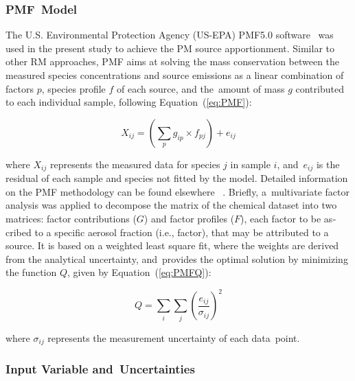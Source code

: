 \begin{otherlanguage}{english}
\subsubsection{PMF~Model}%
\label{ssub:pmf_model}

The U.S. Environmental Protection Agency (US-EPA) PMF5.0 software~\autocite{norrisEPA2014}
was used in the present study to achieve the PM source apportionment. Similar to other RM
approaches, PMF aims at solving the mass conservation between the measured species
concentrations and source emissions as a linear combination of factors $p$, species
profile $f$ of each source,  and the~amount of mass $g$ contributed to each individual
sample, following Equation~(\ref{eq:PMF}):

\begin{equation}
    \label{eq:PMF}
    X_{ij} = \left( \sum_p g_{ip} \times f_{pj} \right) + e_{ij}
\end{equation}

where $X_{ij}$ represents the measured data for species $j$ in sample $i$, and~$e_{ij}$ is
the residual of each sample and species not fitted by the model.  Detailed information on
the PMF methodology can be found elsewhere
~\autocite{paateroPositive1994,paateroLeast1997}. Briefly, a~multivariate factor analysis
was applied to decompose the matrix of the chemical dataset into two matrices: factor
contributions ($G$) and factor profiles ($F$), each factor to be ascribed to a specific
aerosol fraction (i.e., factor), that may be attributed to a source.  It is based on a
weighted least square fit, where the weights are derived from the analytical uncertainty,
and~provides the optimal solution by minimizing the function $Q$, given by
Equation~(\ref{eq:PMFQ}):

\begin{equation}
    \label{eq:PMFQ}
    Q = \sum_i \sum_j \left(\frac{e_{ij}}{\sigma_{ij}}\right)^2
\end{equation}

where $\sigma_{ij}$ represents the measurement uncertainty of each data~point.

\subsubsection{Input Variable and~Uncertainties}%
\label{ssub:input_variable_and_uncertainties}


\end{otherlanguage}
